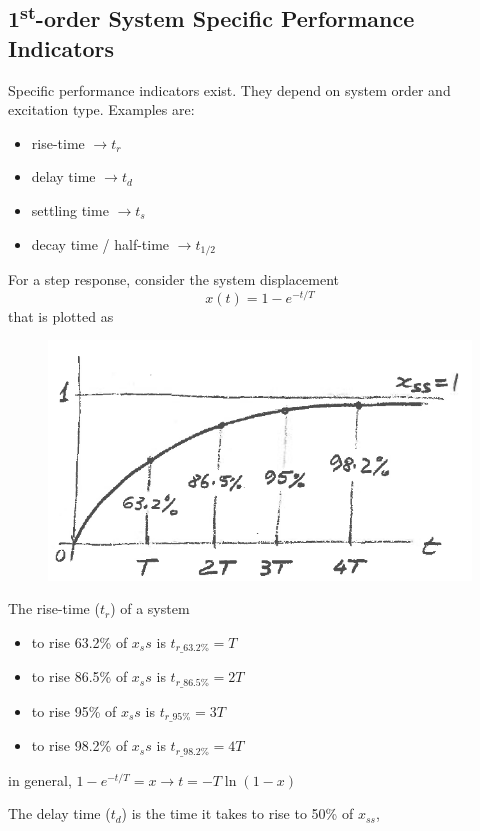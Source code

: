 \documentclass[12pt,letter]{article}
\begin{document}
\subsection{1\textsuperscript{st}-order System Specific Performance Indicators}


Specific performance indicators exist. They depend on system order and excitation type. Examples are:
\begin{itemize}
	\item rise-time $ \rightarrow t_r$
	\item delay time  $ \rightarrow t_d$
	\item settling time $ \rightarrow t_s$
	\item decay time / half-time $ \rightarrow t_{1/2}$
\end{itemize}

For a step response, consider the system displacement
\begin{equation}
x(t) = 1-e^{-t/T}
\end{equation}
that is plotted as
\begin{figure}[H]
	\centering
	\includegraphics[width=4.5in]{../figures/system_specific_performance_indicator_rise_time}
\end{figure}

The rise-time ($t_r$) of a system
\begin{itemize}
\item to rise 63.2\% of $x_ss$ is $t_{r\_63.2\%} = T$
\item to rise 86.5\% of $x_ss$ is $t_{r\_86.5\%} = 2T$
\item to rise 95\% of $x_ss$ is $t_{r\_95\%} = 3T$
\item to rise 98.2\% of $x_ss$ is $t_{r\_98.2\%} = 4T$
\end{itemize}
in general, $1-e^{-t/T} = x \rightarrow t = -T \ln(1-x)$ 

The delay time ($t_d$) is the time it takes to rise to 50\% of $x_{ss}$, 
\end{document}
